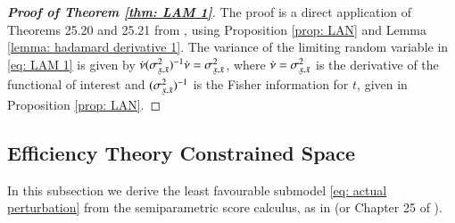 \begin{proof}[\hypertarget{Proof of LAM thm}{\textbf{Proof of Theorem \ref{thm: LAM 1}}}]
The proof is a direct application of Theorems 25.20 and 25.21 from \cite{6}, using Proposition \ref{prop: LAN} and Lemma \ref{lemma: hadamard derivative 1}. The variance of the limiting random variable in \eqref{eq: LAM 1} is given by $\dot{\nu} (\sigma^2_{\ubar{x},\bar{x}})^{-1} \dot{\nu} = \sigma^2_{\ubar{x},\bar{x}}$, where $\dot{\nu} =  \sigma^2_{\ubar{x},\bar{x}}$ is the derivative of the functional of interest and $(\sigma^2_{\ubar{x},\bar{x}})^{-1}$ is the Fisher information for $t$, given in Proposition \ref{prop: LAN}.
\end{proof}

\subsection{Efficiency Theory Constrained Space}

In this subsection we derive the least favourable submodel \eqref{eq: actual perturbation} from the semiparametric score calculus, as in \cite{36} (or Chapter 25 of \cite{6}).

